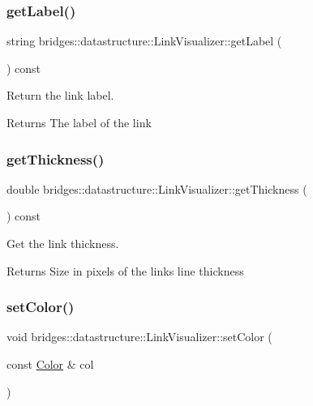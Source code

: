 \subsubsection{\texorpdfstring{getLabel()}{getLabel()}}
{\footnotesize\ttfamily string bridges\+::datastructure\+::\+Link\+Visualizer\+::get\+Label (\begin{DoxyParamCaption}{ }\end{DoxyParamCaption}) const\hspace{0.3cm}{\ttfamily [inline]}}



Return the link label. 

\begin{DoxyReturn}{Returns}
The label of the link 
\end{DoxyReturn}
\mbox{\label{classbridges_1_1datastructure_1_1_link_visualizer_ab8141d3139ea486fceef41df8d61291d}} 
\subsubsection{\texorpdfstring{getThickness()}{getThickness()}}
{\footnotesize\ttfamily double bridges\+::datastructure\+::\+Link\+Visualizer\+::get\+Thickness (\begin{DoxyParamCaption}{ }\end{DoxyParamCaption}) const\hspace{0.3cm}{\ttfamily [inline]}}



Get the link thickness. 

\begin{DoxyReturn}{Returns}
Size in pixels of the link\textquotesingle{}s line thickness 
\end{DoxyReturn}
\mbox{\label{classbridges_1_1datastructure_1_1_link_visualizer_aef9811c2aae77e86f601654a17ce2f87}} 
\subsubsection{\texorpdfstring{setColor()}{setColor()}\hspace{0.1cm}{\footnotesize\ttfamily [1/2]}}
{\footnotesize\ttfamily void bridges\+::datastructure\+::\+Link\+Visualizer\+::set\+Color (\begin{DoxyParamCaption}\item[{const \mbox{\hyperlink{classbridges_1_1datastructure_1_1_color}{Color}} \&}]{col }\end{DoxyParamCaption})\hspace{0.3cm}{\ttfamily [inline]}}



